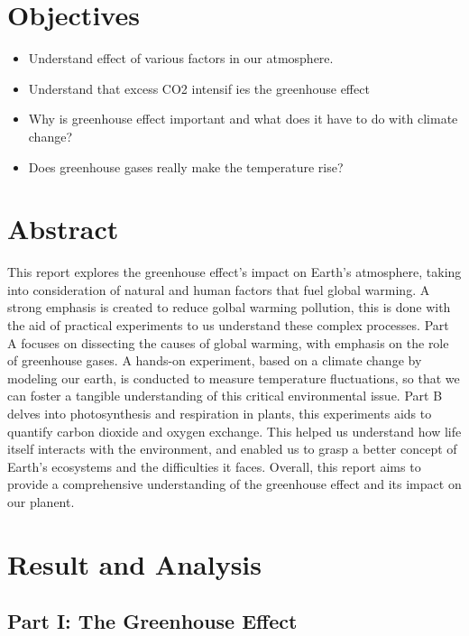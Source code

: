 \documentclass[a4paper, 12pt, english]{article}
\begin{document}


\newpage
\section{Objectives}
\begin{itemize}
	\item Understand effect of various factors in our atmosphere.
	\item Understand that excess CO2 intensif ies the greenhouse effect
	\item Why is greenhouse effect important and what does it have to do with climate
	      change?
	\item Does greenhouse gases really make the temperature rise?
\end{itemize}
\section{Abstract}
This report explores the greenhouse effect's impact on Earth's atmosphere,
taking into consideration of natural and human factors that fuel global
warming. A strong emphasis is created to reduce golbal warming pollution, this
is done with the aid of practical experiments to us understand these complex
processes. Part A focuses on dissecting the causes of global warming, with
emphasis on the role of greenhouse gases. A hands-on experiment, based on a
climate change by modeling our earth, is conducted to measure temperature
fluctuations, so that we can foster a tangible understanding of this critical
environmental issue. Part B delves into photosynthesis and respiration in
plants, this experiments aids to quantify carbon dioxide and oxygen exchange.
This helped us understand how life itself interacts with the environment, and
enabled us to grasp a better concept of Earth's ecosystems and the difficulties
it faces. Overall, this report aims to provide a comprehensive understanding of
the greenhouse effect and its impact on our planent.
\section{Result and Analysis}
\subsection{Part I: The Greenhouse Effect}
\end{document}
